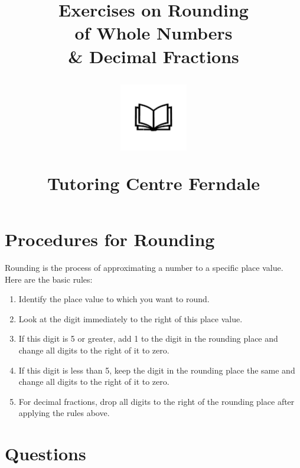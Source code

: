 \documentclass[12pt]{article}
\title{Exercises on Rounding\\of Whole Numbers\\\& Decimal Fractions\\
\begin{center}
\includegraphics[width=4em]{ApS_logo.png}
\end{center}
\begin{normalsize}Tutoring Centre Ferndale \end{normalsize}}
\author{}
\date{}
\begin{document}
\maketitle

\section*{Procedures for Rounding}

Rounding is the process of approximating a number to a specific place value. Here are the basic rules:

\begin{enumerate}
    \item Identify the place value to which you want to round.
    \item Look at the digit immediately to the right of this place value.
    \item If this digit is 5 or greater, add 1 to the digit in the rounding place and change all digits to the right of it to zero.
    \item If this digit is less than 5, keep the digit in the rounding place the same and change all digits to the right of it to zero.
    \item For decimal fractions, drop all digits to the right of the rounding place after applying the rules above.
\end{enumerate}

\section*{Questions}
\end{document}
